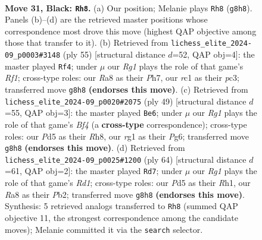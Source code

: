 \documentclass[11pt]{article}
\begin{document}
\clearpage

\begin{figure}[p]\centering
\begin{subfigure}{0.46\textwidth}\centering
\resizebox{\linewidth}{!}{%
\newchessgame
\chessboard[
  setfen={r4kr1/1p3p1p/4b1p1/p2p4/5P2/3K4/PP2B1PP/2R3RN b - - 4 31},
  showmover=false,
  pgfstyle=straightmove, color=movearrow, markmove={g8-h8}
]}
\caption{}
\end{subfigure}\hfill
\begin{subfigure}{0.46\textwidth}\centering
\resizebox{\linewidth}{!}{%
\newchessgame
\chessboard[
  setfen={5rk1/1p2b1pp/p2p4/P2Pp3/7P/2P5/1P1Nr3/K2R3R b - - 0 28},
  showmover=false,
  pgfstyle=straightmove, color=movearrow, markmove={f8-f4}
]}
\caption{}
\end{subfigure}
\\[4pt]
\begin{subfigure}{0.46\textwidth}\centering
\resizebox{\linewidth}{!}{%
\newchessgame
\chessboard[
  setfen={2k4r/pp3p2/2p3pp/5b2/8/4PP2/Pb2B1PP/3RK2R b K - 0 25},
  showmover=false,
  pgfstyle=straightmove, color=movearrow, markmove={f5-e6}
]}
\caption{}
\end{subfigure}\hfill
\begin{subfigure}{0.46\textwidth}\centering
\resizebox{\linewidth}{!}{%
\newchessgame
\chessboard[
  setfen={r4r2/1p3p1k/5B1p/p4p2/1nP4P/8/1P3PP1/1K1R3R w - - 0 33},
  showmover=false,
  pgfstyle=straightmove, color=movearrow, markmove={d1-d7}
]}
\caption{}
\end{subfigure}
\caption{\textbf{Move 31, Black: \texttt{Rh8}.} (a) Our position; Melanie plays \texttt{Rh8} (\texttt{g8h8}). Panels (b)--(d) are the retrieved master positions whose correspondence most drove this move (highest QAP objective among those that transfer to it). (b) Retrieved from \texttt{lichess\_elite\_2024-09\_p0003\#3148} (ply 55) [structural distance $d$=52, QAP obj=4]: the master played \texttt{Rf4}; under $\mu$ our \emph{Rg1} plays the role of that game's \emph{Rf1}; cross-type roles: our \emph{R}a8 as their \emph{P}h7, our \emph{r}c1 as their \emph{p}c3; transferred move \texttt{g8h8} \textbf{(endorses this move)}. (c) Retrieved from \texttt{lichess\_elite\_2024-09\_p0020\#2075} (ply 49) [structural distance $d$=55, QAP obj=3]: the master played \texttt{Be6}; under $\mu$ our \emph{Rg1} plays the role of that game's \emph{Bf4} (a \textbf{cross-type} correspondence); cross-type roles: our \emph{P}d5 as their \emph{R}h8, our \emph{r}g1 as their \emph{P}g6; transferred move \texttt{g8h8} \textbf{(endorses this move)}. (d) Retrieved from \texttt{lichess\_elite\_2024-09\_p0025\#1200} (ply 64) [structural distance $d$=61, QAP obj=2]: the master played \texttt{Rd7}; under $\mu$ our \emph{Rg1} plays the role of that game's \emph{Rd1}; cross-type roles: our \emph{P}d5 as their \emph{R}h1, our \emph{R}a8 as their \emph{P}b2; transferred move \texttt{g8h8} \textbf{(endorses this move)}. Synthesis: 5 retrieved analogs transferred to \texttt{Rh8} (summed QAP objective 11, the strongest correspondence among the candidate moves); Melanie committed it via the \texttt{search} selector.}
\label{fig:thought-m61}
\end{figure}
\end{document}

